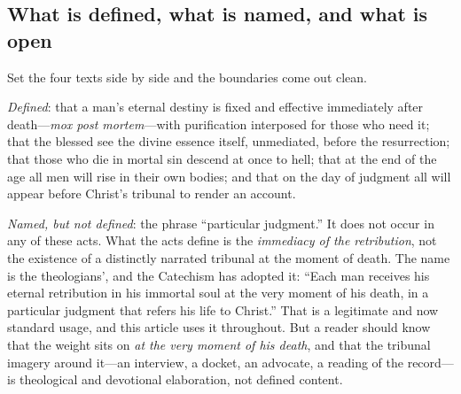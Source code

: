 \subsection{What is defined, what is named, and what is open}

Set the four texts side by side and the boundaries come out clean.

\emph{Defined}: that a man's eternal destiny is fixed and effective immediately after death---\emph{mox post mortem}---with purification interposed for those who need it; that the blessed see the divine essence itself, unmediated, before the resurrection; that those who die in mortal sin descend at once to hell; that at the end of the age all men will rise in their own bodies; and that on the day of judgment all will appear before Christ's tribunal to render an account.

\emph{Named, but not defined}: the phrase ``particular judgment.'' It does not occur in any of these acts. What the acts define is the \emph{immediacy of the retribution}, not the existence of a distinctly narrated tribunal at the moment of death. The name is the theologians', and the Catechism has adopted it: ``Each man receives his eternal retribution in his immortal soul at the very moment of his death, in a particular judgment that refers his life to Christ.'' That is a legitimate and now standard usage, and this article uses it throughout. But a reader should know that the weight sits on \emph{at the very moment of his death}, and that the tribunal imagery around it---an interview, a docket, an advocate, a reading of the record---is theological and devotional elaboration, not defined content.

